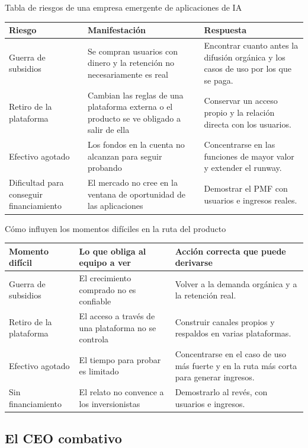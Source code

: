 \begin{knowledgebox}{Tabla de riesgos de una empresa emergente de aplicaciones de IA}
\begin{tabularx}{\textwidth}{p{}p{}X}
\toprule
Riesgo & Manifestación & Respuesta \\
\midrule
Guerra de subsidios & Se compran usuarios con dinero y la retención no necesariamente es real & Encontrar cuanto antes la difusión orgánica y los casos de uso por los que se paga. \\
Retiro de la plataforma & Cambian las reglas de una plataforma externa o el producto se ve obligado a salir de ella & Conservar un acceso propio y la relación directa con los usuarios. \\
Efectivo agotado & Los fondos en la cuenta no alcanzan para seguir probando & Concentrarse en las funciones de mayor valor y extender el runway. \\
Dificultad para conseguir financiamiento & El mercado no cree en la ventana de oportunidad de las aplicaciones & Demostrar el PMF con usuarios e ingresos reales. \\
\bottomrule
\end{tabularx}
\end{knowledgebox}

\begin{knowledgebox}{Cómo influyen los momentos difíciles en la ruta del producto}
\begin{tabularx}{\textwidth}{p{}p{}X}
\toprule
Momento difícil & Lo que obliga al equipo a ver & Acción correcta que puede derivarse \\
\midrule
Guerra de subsidios & El crecimiento comprado no es confiable & Volver a la demanda orgánica y a la retención real. \\
Retiro de la plataforma & El acceso a través de una plataforma no se controla & Construir canales propios y respaldos en varias plataformas. \\
Efectivo agotado & El tiempo para probar es limitado & Concentrarse en el caso de uso más fuerte y en la ruta más corta para generar ingresos. \\
Sin financiamiento & El relato no convence a los inversionistas & Demostrarlo al revés, con usuarios e ingresos. \\
\bottomrule
\end{tabularx}
\end{knowledgebox}

\subsection{El CEO combativo}

